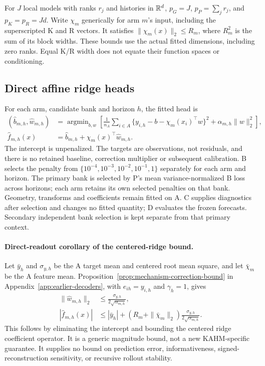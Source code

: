 For $J$ local models with ranks $r_j$ and histories in $\mathbb{R}^d$,
$p_G=J$, $p_P=\sum_j r_j$, and $p_K=p_R=Jd$.
Write $\chi_m$ generically for arm $m$'s input, including the
superscripted K and R vectors. It satisfies
$\|\chi_m(x)\|_2\leq R_m$, where $R_m^2$ is the sum of its block
widths. These bounds use the actual fitted dimensions, including
zero ranks. Equal K/R width does not equate their function spaces
or conditioning.

\subsection{Direct affine ridge heads}

For each arm, candidate bank and horizon $h$, the fitted head is
\begin{equation}
 \begin{aligned}
 (\widehat b_{m,h},\widehat w_{m,h})
 &=\mathop{\arg\min}_{b,w}
 \left[\frac1{n_A}\sum_{i\in A}
 \{y_{i,h}-b-\chi_m(x_i)^\top w\}^2
 +\alpha_{m,h}\|w\|_2^2\right],\\
 \widehat f_{m,h}(x)&=\widehat b_{m,h}
                    +\chi_m(x)^\top\widehat w_{m,h}.
 \end{aligned}
 \label{eq:softstate-direct-ridge}
\end{equation}
The intercept is unpenalized. The targets are observations, not
residuals, and there is no retained baseline, correction multiplier
or subsequent calibration. B selects the penalty from
$\{10^{-4},10^{-3},10^{-2},10^{-1},1\}$ separately for each
arm and horizon. The primary bank is selected by P's mean
variance-normalized B loss across horizons; each arm retains its
own selected penalties on that bank. Geometry, transforms and
coefficients remain fitted on A. C supplies diagnostics after
selection and changes no fitted quantity; D evaluates the frozen
forecasts. Secondary independent bank selection is kept separate
from that primary context.

\paragraph{Direct-readout corollary of the centered-ridge bound.}
Let $\bar y_h$ and $\sigma_{y,h}$ be the A target mean and centered
root mean square, and let $\bar\chi_m$ be the A feature mean.
Proposition~\ref{prop:mechanism-correction-bound} in
Appendix~\ref{app:earlier-decoders}, with $e_{ih}=y_{i,h}$ and
$\gamma_h=1$, gives
\begin{equation}
 \begin{aligned}
 \|\widehat w_{m,h}\|_2
 &\leq \frac{\sigma_{y,h}}{2\sqrt{\alpha_{m,h}}},\\
 |\widehat f_{m,h}(x)|
 &\leq |\bar y_h|+
 (R_m+\|\bar\chi_m\|_2)
 \frac{\sigma_{y,h}}{2\sqrt{\alpha_{m,h}}}.
 \end{aligned}
 \label{eq:softstate-direct-bound}
\end{equation}
This follows by eliminating the intercept and bounding the
centered ridge coefficient operator. It is a generic magnitude
bound, not a new KAHM-specific guarantee. It supplies no bound
on prediction error, informativeness, signed-reconstruction
sensitivity, or recursive rollout stability.

